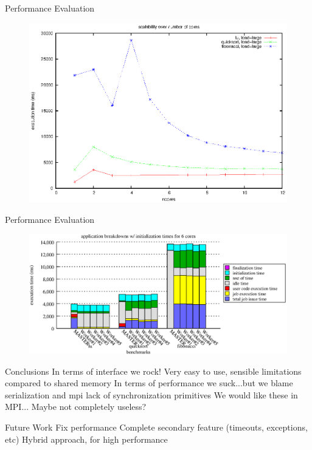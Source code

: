 \documentclass[svgnames]{beamer}
\begin{document}
\begin{frame}{Performance Evaluation}
\begin{figure}
\center
\includegraphics[width=.7\textwidth]{images/apps_scalability}
\end{figure}
\end{frame}
\begin{frame}{Performance Evaluation}
\begin{figure}
\center
\includegraphics[width=\textwidth]{images/app_breakdowns_w_init}
\end{figure}
\end{frame}
\begin{frame}{Conclusions}
In terms of interface we rock! Very easy to use, sensible limitations compared to shared memory
In terms of performance we suck...but we blame serialization and mpi lack of synchronization primitives
We would like these in MPI...
Maybe not completely useless?
\end{frame}
\begin{frame}{Future Work}
Fix performance
Complete secondary feature (timeouts, exceptions, etc)
Hybrid approach, for high performance
\end{frame}
\end{document}
